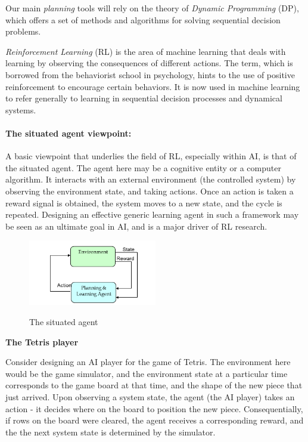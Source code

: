 Our main \emph{planning} tools will rely on the theory of \emph{Dynamic Programming} (DP), which offers a set of methods and algorithms for solving sequential decision problems.

\emph{Reinforcement Learning} (RL) is the area of machine learning that deals with learning by observing the consequences of different actions. The term, which is borrowed from the behaviorist school in psychology, hints to the use of positive reinforcement to encourage certain behaviors. It is now used in machine learning to refer generally to learning in sequential decision processes and dynamical systems.

\paragraph{The situated agent viewpoint:} A basic viewpoint that underlies the field of RL, especially within AI, is that of the situated agent. The agent here may be a cognitive entity or a computer algorithm. It interacts with an external environment (the controlled system) by observing the environment state, and taking actions. Once an action is taken a reward signal is obtained, the system moves to a new state, and the cycle is repeated.
Designing an effective generic learning agent in such a framework may be seen as an ultimate goal in AI, and is a major driver of RL research.

\begin{figure}
  \begin{centering}
  \includegraphics[width=0.5\textwidth]{lecture1_situated_agent}\\
  \caption{The situated agent}\label{fig:situated_agent}
  \end{centering}
\end{figure}

\begin{example}{\textbf{The Tetris player}}

Consider designing an AI player for the game of Tetris. The environment here would be the game simulator, and the environment state at a particular time corresponds to the game board at that time, and the shape of the new piece that just arrived. Upon observing a system state, the agent (the AI player) takes an action - it decides where on the board to position the new piece. Consequentially, if rows on the board were cleared, the agent receives a corresponding reward, and the the next system state is determined by the simulator.
\end{example}

